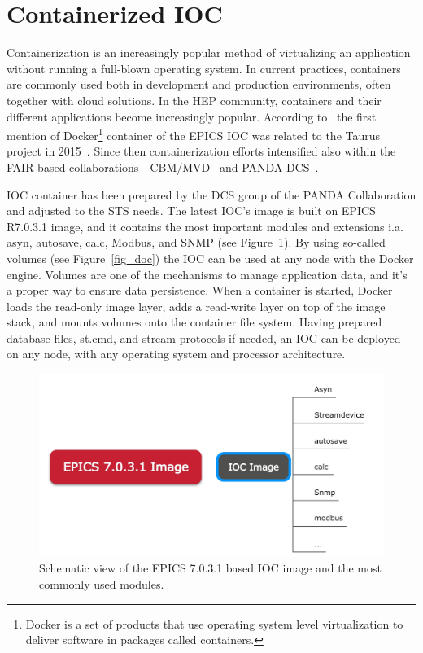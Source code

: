 \section{Containerized IOC}
\label{containerizer_ioc}
Containerization is an increasingly popular method of virtualizing an application without running a full-blown operating system. In current practices, containers are commonly used both in development and production environments, often together with cloud solutions. In the \gls{HEP} community, containers and their different applications become increasingly popular. According to~\cite{Klaus2021} the first mention of Docker\footnote{Docker is a set of products that use operating system level virtualization to deliver software in packages called containers.} container of the \gls{EPICS} \gls{IOC} was related to the Taurus project in 2015~\cite{taurus}. Since then containerization efforts intensified also within the \gls{FAIR} based collaborations - \gls{CBM}/\gls{MVD}~\cite{Klaus2021} and PANDA DCS~\cite{PANDA_1}.

IOC container has been prepared by the \gls{DCS} group of the \gls{PANDA} Collaboration and adjusted to the \gls{STS} needs. The latest \gls{IOC}'s image is built on EPICS R7.0.3.1 image, and it contains the most important modules and extensions i.a. asyn, autosave, calc, Modbus, and SNMP (see Figure~\ref{fig_ioc1}). By using so-called volumes (see Figure~\ref{fig_doc}) the \gls{IOC} can be used at any node with the Docker engine. Volumes are one of the mechanisms to manage application data, and it's a proper way to ensure data persistence. When a container is started, Docker loads the read-only image layer, adds a read-write layer on top of the image stack, and mounts volumes onto the container file system. Having prepared database files, st.cmd, and stream protocols if needed, an \gls{IOC} can be deployed on any node, with any operating system and processor architecture.
\begin{figure}[!h]
\centering
\includegraphics[width=0.7\columnwidth]{Chapter4/images/epics_ioc.jpg}
\caption{Schematic view of the EPICS 7.0.3.1 based \gls{IOC} image and the most commonly used modules.}
\label{fig_ioc1}
\end{figure}


